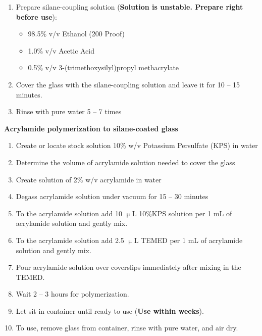 \begin{appendices}
\begin{enumerate}
  \item Prepare silane-coupling solution ({\bf Solution is unstable. Prepare right before use}):
  \begin{itemize}
    \item 98.5\% v/v Ethanol (200 Proof)
    \item 1.0\% v/v Acetic Acid
    \item 0.5\% v/v 3-(trimethoxysilyl)propyl methacrylate
  \end{itemize}
  \item Cover the glass with the silane-coupling solution and leave it for 10 -- 15 minutes.
  \item Rinse with pure water 5 -- 7 times
\end{enumerate}
{\bf Acrylamide polymerization to silane-coated glass}
\begin{enumerate}
  \item Create or locate stock solution 10\% w/v Potassium Persulfate (KPS) in water
  \item Determine the volume of acrylamide solution needed to cover the glass
  \item Create solution of 2\% w/v acrylamide in water
  \item Degass acrylamide solution under vacuum for 15 -- 30 minutes
  \item To the acrylamide solution add 10 $\upmu$L 10\%KPS solution per 1 mL of acrylamide solution and gently mix.
  \item To the acrylamide solution add 2.5 $\upmu$L TEMED per 1 mL of acrylamide solution and gently mix.
  \item Pour acrylamide solution over coverslips immediately after mixing in the TEMED.
  \item Wait 2 -- 3 hours for polymerization.
  \item Let sit in container until ready to use ({\bf Use within weeks}).
  \item To use, remove glass from container, rinse with pure water, and air dry.
\end{enumerate}

\end{appendices}
